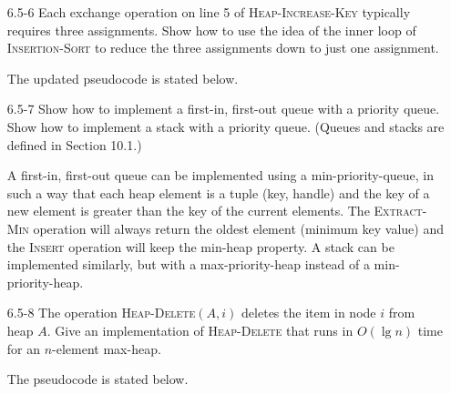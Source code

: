 \begin{enumerate}
\item[6.5{-}6]{Each exchange operation on line 5 of \textsc{Heap-Increase-Key}
typically requires three assignments. Show how to use the idea of the inner
loop of \textsc{Insertion-Sort} to reduce the three assignments down to just one
assignment.}

\begin{framed}
The updated pseudocode is stated below.

\begin{algorithm}[H]
\SetAlgoNoEnd\DontPrintSemicolon
\BlankLine
{}
\end{algorithm}
\end{framed}

\item[6.5{-}7]{Show how to implement a first-in, first-out queue with a priority
queue. Show how to implement a stack with a priority queue. (Queues and stacks
are defined in Section 10.1.)}

\begin{framed}
A first-in, first-out queue can be implemented using a min-priority-queue, in
such a way that each heap element is a tuple (key, handle) and the key of a new
element is greater than the key of the current elements. The
\textsc{Extract-Min} operation will always return the oldest element (minimum
key value) and the \textsc{Insert} operation will keep the min-heap property.
A stack can be implemented similarly, but with a max-priority-heap instead of
a min-priority-heap.
\end{framed}

\item[6.5{-}8]{The operation \textsc{Heap-Delete}$(A, i)$ deletes the item in
node $i$ from heap $A$. Give an implementation of \textsc{Heap-Delete} that runs
in $O(\lg n)$ time for an $n$-element max-heap.}

\begin{framed}
The pseudocode is stated below.

\begin{algorithm}[H]
\SetAlgoNoEnd\DontPrintSemicolon
\BlankLine
{}
\end{algorithm}
\end{framed}


\end{enumerate}
